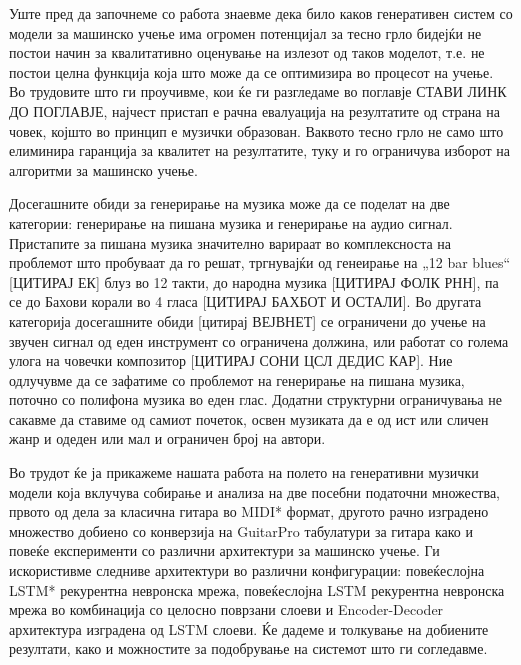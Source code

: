 Уште пред да започнеме со работа знаевме дека било каков генеративен систем со модели за машинско учење има огромен потенцијал за тесно грло бидејќи не постои начин за квалитативно оценување на излезот од таков моделот, т.е. не постои целна функција која што може да се оптимизира во процесот на учење. Во трудовите што ги проучивме, кои ќе ги разгледаме во поглавје {СТАВИ ЛИНК ДО ПОГЛАВЈЕ}, најчест пристап е рачна евалуација на резултатите од страна на човек, којшто во принцип е музички образован. Ваквото тесно грло не само што елиминира гаранција за квалитет на резултатите, туку и го ограничува изборот на алгоритми за машинско учење. 

Досегашните обиди за генерирање на музика може да се поделат на две категории: генерирање на пишана музика и генерирање на аудио сигнал. Пристапите за пишана музика значително варираат во комплексноста на проблемот што пробуваат да го решат, тргнувајќи од генеирање на „12 bar blues“ [ЦИТИРАЈ ЕК] блуз во 12 такти, до народна музика [ЦИТИРАЈ ФОЛК РНН], па се до Бахови корали во 4 гласа [ЦИТИРАЈ БАХБОТ И ОСТАЛИ]. Во другата категорија досегашните обиди [цитирај ВЕЈВНЕТ] се ограничени до учење на звучен сигнал од еден инструмент со ограничена должина, или работат со голема улога на човечки композитор [ЦИТИРАЈ СОНИ ЦСЛ ДЕДИС КАР]. Ние одлучувме да се зафатиме со проблемот на генерирање на пишана музика, поточно со полифона музика во еден глас. Додатни структурни ограничувања не сакавме да ставиме од самиот почеток, освен музиката да е од ист или сличен жанр и одеден или мал и ограничен број на автори.

Во трудот ќе ја прикажеме нашата работа на полето на генеративни музички модели која вклучува собирање и анализа на две посебни податочни множества, првото од дела за класична гитара во MIDI* формат, другото рачно изградено множество добиено со конверзија на GuitarPro табулатури за гитара како и повеќе експерименти со различни архитектури за машинско учење. Ги искористивме следниве архитектури во различни конфигурации: повеќеслојна LSTM* рекурентна невронска мрежа, повеќеслојна LSTM рекурентна невронска мрежа во комбинација со целосно поврзани слоеви и Encoder-Decoder архитектура изградена од LSTM слоеви. Ќе дадеме и толкување на добиените резултати, како и можностите за подобрување на системот што ги согледавме.

